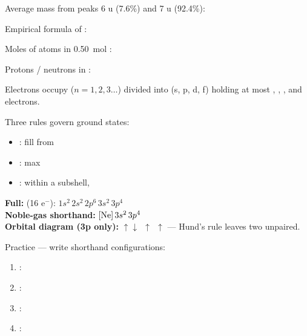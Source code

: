 \documentclass{apchem-notes}
\begin{document}

\begin{warmup}[4]
  \item Average mass from peaks 6 u (7.6\%) and 7 u (92.4\%):
  \item Empirical formula of : 
  \item Moles of  atoms in \SI{0.50}{\mole} :
  \item Protons / neutrons in : 
\end{warmup}



Electrons occupy  ($n = 1, 2, 3\ldots$) divided into
 (s, p, d, f) holding at most
, ,
, and  electrons.

Three rules govern ground states:
\begin{itemize}[leftmargin=*,itemsep=0.2em]
  \item {}: fill from 
  \item {}: max 
  \item {}: within a subshell, 
\end{itemize}

\begin{workedexample}
\textbf{Full:}  (16 e$^-$): $1s^2\,2s^2\,2p^6\,3s^2\,3p^4$\\
\textbf{Noble-gas shorthand:} $[\ce{Ne}]\,3s^2\,3p^4$\\
\textbf{Orbital diagram (3p only):}
$\uparrow\downarrow\ \ \uparrow\ \ \uparrow$ --- Hund's rule leaves two
unpaired.
\end{workedexample}

Practice --- write shorthand configurations:
\begin{enumerate}[leftmargin=*,itemsep=0.3em]
  \item {}: 
  \item {}: 
  \item {}: 
  \item {}: 
\end{enumerate}
\end{document}
